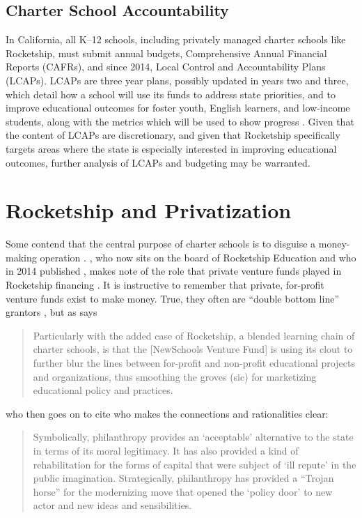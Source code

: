 \subsection{Charter School Accountability}\label{sec:charter-accountability}\indent

In California, all K–12 schools, including privately managed charter schools like Rocketship, must submit annual budgets, Comprehensive Annual Financial Reports (CAFRs), and since 2014, Local Control and Accountability Plans (LCAPs). LCAPs are three year plans, possibly updated in years two and three, which detail how a school will use its funds to address state priorities, and to improve educational outcomes for foster youth, English learners, and low-income students, along with the metrics which will be used to show progress \parencite[66–84]{Aguinaldo.etal2021}. Given that the content of LCAPs are discretionary, and given that Rocketship specifically targets areas where the state is especially interested in improving educational outcomes, further analysis of LCAPs and budgeting may be warranted.

\section{Rocketship and Privatization}\label{sec:rocketship-privatization}\indent

Some contend that the central purpose of charter schools is to disguise a money-making operation \parencite{Saltman2018c}. \citeauthor{Whitmire2014}, who now sits on the board of Rocketship Education and who in 2014 published , makes note of the role that private venture funds played in Rocketship financing \parencite[25,65]{Whitmire2014}. It is instructive to remember that private, for-profit venture funds exist to make money. True, they often are ``double bottom line'' grantors \parencite{Clark.etal2004}, but as
\citeauthor{Tewksbury2016} says 
\blockquote[{\parencite[75]{Tewksbury2016}}][]{\SingleSpacing\vspace{-0.5\baselineskip}%
  Particularly with the added case of Rocketship, a blended learning chain of charter schools, is that the [NewSchools Venture Fund] is using its clout to further blur the lines between for-profit and non-profit educational projects and organizations, thus smoothing the groves (sic) for marketizing educational policy and practices.}
who then goes on to cite \citeauthor{Ball2012} who makes the connections and rationalities clear:
\blockquote[{\parencite[32]{Ball2012}}][]{\SingleSpacing\vspace{-0.5\baselineskip}%
Symbolically, philanthropy provides an `acceptable' alternative to the state in terms of its moral legitimacy.  It has also provided a kind of rehabilitation for the forms of capital that were subject of `ill repute' in the public imagination. Strategically, philanthropy has provided a ``Trojan horse'' for the modernizing move that opened the `policy door' to new actor and new ideas and sensibilities.}
  
